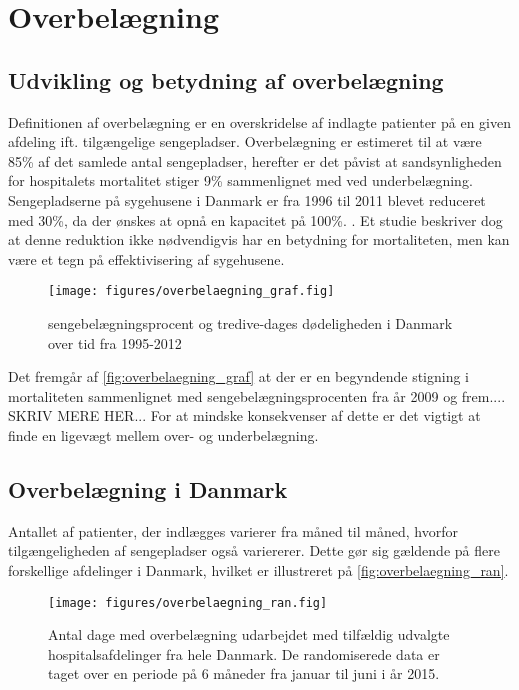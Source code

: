 \section{Overbelægning}

\subsection{Udvikling og betydning af overbelægning}
Definitionen af overbelægning er en overskridelse af indlagte patienter på en given afdeling ift. tilgængelige sengepladser. Overbelægning er estimeret til at være 85\% af det samlede antal sengepladser, herefter er det påvist at sandsynligheden for hospitalets mortalitet stiger 9\% sammenlignet med ved underbelægning.\citep{Madsen2014} Sengepladserne på sygehusene i Danmark er fra 1996 til 2011 blevet reduceret med 30\%, da der ønskes at opnå en kapacitet på 100\%. 
\citep{Madsen2014}. Et studie beskriver dog at denne reduktion ikke nødvendigvis har en betydning for mortaliteten, men kan være et tegn på effektivisering af sygehusene. \citep{Madsen2014}

\begin{figure}[H]
\centering
\texttt{[image: figures/overbelaegning\_graf.fig]}
\caption{sengebelægningsprocent og tredive-dages dødeligheden i Danmark over tid fra 1995-2012}
\label{fig:overbelaegning_graf}
\end{figure}

\noindent
Det fremgår af \autoref{fig:overbelaegning_graf} at der er en begyndende stigning i mortaliteten sammenlignet med sengebelægningsprocenten fra år 2009 og frem.... SKRIV MERE HER...
\citep{dodlighed2014} For at mindske konsekvenser af dette er det vigtigt at finde en ligevægt mellem over- og underbelægning.  


\subsection{Overbelægning i Danmark}
Antallet af patienter, der indlægges varierer fra måned til måned, hvorfor tilgængeligheden af sengepladser også variererer. Dette gør sig gældende på flere forskellige afdelinger i Danmark, hvilket er illustreret på \autoref{fig:overbelaegning_ran}.
                   
\begin{figure}[H]
\centering
\texttt{[image: figures/overbelaegning\_ran.fig]}
\caption{Antal dage med overbelægning udarbejdet med tilfældig udvalgte hospitalsafdelinger fra hele Danmark. De randomiserede data er taget over en periode på 6 måneder fra januar til juni i år 2015. \citep{SDS2015}}
\label{fig:overbelaegning_ran}
\end{figure}

